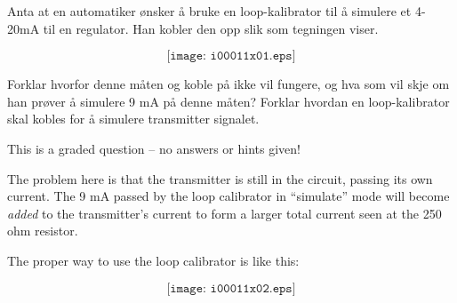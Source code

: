 

Anta at en automatiker ønsker å bruke en loop-kalibrator til å simulere et 4-20mA til en regulator. Han kobler den opp slik som tegningen viser. 

$$\texttt{[image: i00011x01.eps]}$$

Forklar hvorfor denne måten og koble på ikke vil fungere, og hva som vil skje om han prøver å simulere 9 mA på denne måten? Forklar hvordan en loop-kalibrator skal kobles for å simulere transmitter signalet. 

\vfil

\eject






This is a graded question -- no answers or hints given!







The problem here is that the transmitter is still in the circuit, passing its own current.  The 9 mA passed by the loop calibrator in ``simulate'' mode will become {\it added} to the transmitter's current to form a larger total current seen at the 250 ohm resistor.

The proper way to use the loop calibrator is like this:

$$\texttt{[image: i00011x02.eps]}$$




